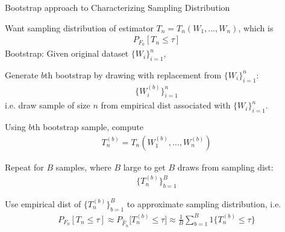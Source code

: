 \documentclass[aspectratio=169, handout]{beamer}
\begin{document}
{\scriptsize
\begin{frame}{Bootstrap approach to Characterizing Sampling Distribution}

Want sampling distribution of estimator
$T_n=T_n(W_1,\ldots,W_n)$, which is
\begin{align*}
  P_{F_0}[T_n \leq \tau]
\end{align*}
Bootstrap: Given original dataset $\{W_i\}_{i=1}^n$,
\begin{enumerate}
  {\footnotesize
  \item[(i)] Generate $b$th bootstrap by drawing with replacement from
    $\{W_i\}_{i=1}^n$:
    \begin{align*}
      \{W_i^{(b)}\}_{i=1}^n
    \end{align*}
    i.e. draw sample of size $n$ from empirical dist
    associated with $\{W_i\}_{i=1}^n$.
  \item[(ii)] Using $b$th bootstrap sample, compute
    \begin{align*}
      T_n^{(b)}=T_n(W_1^{(b)},\ldots,W_n^{(b)})
    \end{align*}
  \item[(iii)] Repeat for $B$ samples, where $B$ large to get
    $B$ draws from sampling dist:
    \begin{align*}
      \{T_n^{(b)}\}_{b=1}^B
    \end{align*}
  \item[(iv)]
    Use empirical dist of $\{T_n^{(b)}\}_{b=1}^B$ to
    approximate sampling distribution, i.e.
    \begin{align*}
      P_{F_0}[T_n \leq \tau]
      \approx
      P_{\hat{F}_n}
      \big[
      T_n^{(b)}\leq \tau
      \big]
      \approx
      \frac{1}{B}
      \sum_{b=1}^B
      1\{T_n^{(b)}\leq \tau\}
    \end{align*}
  }
\end{enumerate}
\end{frame}
}
\end{document}
